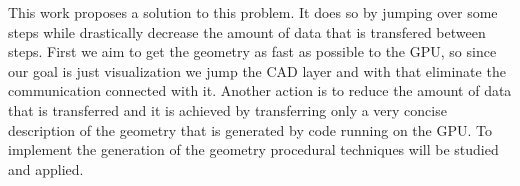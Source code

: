 

This work proposes a solution to this problem. It does so by jumping over some steps while drastically decrease the amount of data that is transfered between steps. First we aim to get the geometry as fast as possible to the GPU, so since our goal is just visualization we jump the CAD layer and with that eliminate the communication connected with it. Another action is to reduce the amount of data that is transferred and it is achieved by transferring only a very concise description of the geometry that is generated by code running on the GPU. To implement the generation of the geometry procedural techniques will be studied and applied.

